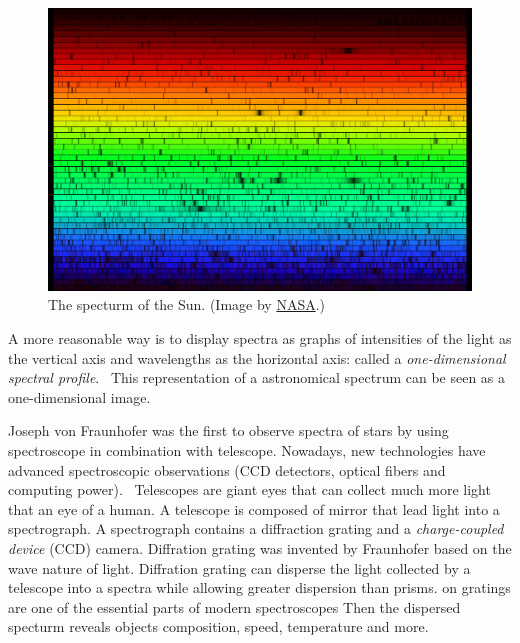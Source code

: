 \begin{figure}
\includegraphics[width=\textwidth]{img/solarspectrum.jpg}
\caption[The Solar spectrum]{
	The specturm of the Sun. (Image by \href{https://solarsystem.nasa.gov/resources/390/the-solar-spectrum/}{NASA}.)
}
\label{solar_spectrum}
\end{figure}

A more reasonable way is to display spectra as graphs of intensities of the light as the vertical axis and wavelengths as the horizontal axis:
called a \textit{one-dimensional spectral profile}.~\cite{cochard2018}
This representation of a astronomical spectrum can be seen as a one-dimensional image.~\cite{bennett2005}



Joseph von Fraunhofer was the first to observe spectra of stars by using spectroscope in combination with telescope.
Nowadays, new technologies have advanced spectroscopic observations
(CCD detectors, optical fibers and computing power).~\cite{cochard2018}
Telescopes are giant eyes that can collect much more light that an eye of a human.
A telescope is composed of mirror that lead light into a spectrograph.
A spectrograph contains a diffraction grating and a \textit{charge-coupled device} (CCD) camera.
Diffration grating was invented by Fraunhofer based on the wave nature of light.
Diffration grating can disperse the light collected by a telescope into a spectra
while allowing greater dispersion than prisms.
on gratings are one of the essential parts of modern spectroscopes
Then the dispersed specturm reveals objects composition, speed, temperature
and more.~\cite{bennett2005}

